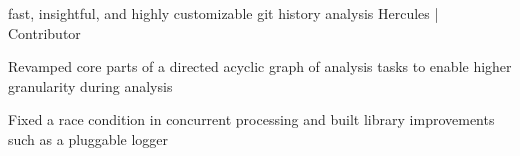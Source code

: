 \begin{cventries}
  \cventry
    {fast, insightful, and highly customizable git history analysis} %
    {Hercules | Contributor} %
    {} %
    {} %
    {
      \begin{cvitems} %
        \item {Revamped core parts of a directed acyclic graph of analysis tasks to enable higher granularity during analysis}
        \item {Fixed a race condition in concurrent processing and built library improvements such as a pluggable logger}
      \end{cvitems}
    }

\end{cventries}

